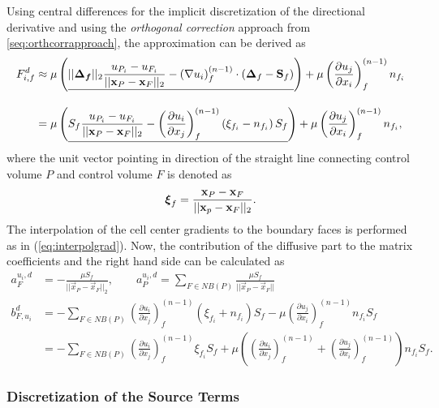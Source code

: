 Using central differences for the implicit discretization of the directional derivative and using the \emph{orthogonal correction} approach from \ref{seq:orthcorrapproach}, the approximation can be derived as
\begin{align*}
  F_{i,f}^d 
  &\approx 
  \mu \left( \underline{||\boldsymbol{\boldsymbol{\Delta}_f}||_2 \frac{u_{P_i} - u_{F_i}}{ || \mathbf{x}_P - \mathbf{x}_F ||_2 }  
  -  \left(\nabla u_i \right)_f^{(n-1)} \cdot \left(\boldsymbol{\Delta}_f - \mathbf{S}_f\right)  }  \right)
  + \mu \left( \frac{\partial u_j}{\partial x_i} \right)_f^{(n-1)} n_{f_i} \\[1em]
  &= \mu \left(\underline{  S_f \frac{u_{P_i} - u_{F_i}}{ || \mathbf{x}_P - \mathbf{x}_F ||_2 }  
  - \left( \frac{\partial u_i}{\partial x_j}\right)_f^{(n-1)} \left(\xi_{f_i} - n_{f_i}\right)S_f  } \right)
  + \mu \left( \frac{\partial u_j}{\partial x_i} \right)_f^{(n-1)} n_{f_i},
\end{align*}
where the unit vector pointing in direction of the straight line connecting control volume \(P\) and control volume \(F\) is denoted as
\begin{displaymath}
  \boldsymbol{\xi}_f = \frac{\mathbf{x}_P - \mathbf{x}_F}{|| \mathbf{x}_p - \mathbf{x}_F ||_2}.
\end{displaymath}
The interpolation of the cell center gradients to the boundary faces is performed as in (\ref{eq:interpolgrad}). Now, the contribution of the diffusive part to the matrix coefficients and the right hand side can be calculated as
\begin{align*}
  a_F^{u_i,d} &= - \frac{\mu S_f}{||\vec{x}_P - \vec{x}_F||_2}, 
  \quad \quad a_P^{u_i,d} = \sum_{F \in NB(P)} \frac{\mu S_f}{|| \vec{x}_P - \vec{x}_F ||} \\[1em]
  b_{F,u_i}^d &=  - \sum_{F \in NB(P)} \left( \frac{\partial u_i}{\partial x_j}\right)_f^{(n-1)} \left(\xi_{f_i} + n_{f_i}\right)S_f  
  - \mu \left( \frac{\partial u_j}{\partial x_i} \right)_f^{(n-1)} n_{f_i} S_f   \nonumber \\[0.5em]
  &=  - \sum_{F \in NB(P)} \left( \frac{\partial u_i}{\partial x_j}\right)_f^{(n-1)} \xi_{f_i} S_f
  + \mu \left( \left( \frac{\partial u_i}{\partial x_j} \right)_f^{(n-1)}
  + \left( \frac{\partial u_j}{\partial x_i} \right)_f^{(n-1)} \right) n_{f_i} S_f.
\end{align*}

\subsubsection{Discretization of the Source Terms}

